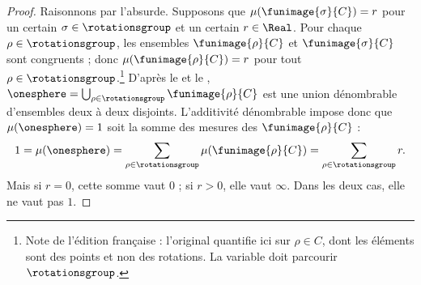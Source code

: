\documentclass[../../../include/open-logic-section]{subfiles}
\begin{document}
\begin{proof}
Raisonnons par l'absurde.
Supposons que
$\mu(\funimage{\sigma}{C})=r$
pour un certain
$\sigma\in\rotationsgroup$
et un certain $r\in\Real$.
Pour chaque
$\rho\in\rotationsgroup$,
les ensembles
$\funimage{\rho}{C}$ et
$\funimage{\sigma}{C}$
sont congruents ; donc
$\mu(\funimage{\rho}{C})=r$
pour tout
$\rho\in\rotationsgroup$.\footnote{
Note de l'édition française :
l'original quantifie ici sur
$\rho\in C$, dont les éléments
sont des points et non des
rotations. La variable doit
parcourir $\rotationsgroup$.}
D'après le 
et le ,
$\onesphere=
\bigcup_{\rho\in\rotationsgroup}
\funimage{\rho}{C}$
est une union dénombrable
d'ensembles deux à deux
disjoints. L'additivité
dénombrable impose donc
que $\mu(\onesphere)=1$
soit la somme des mesures
des $\funimage{\rho}{C}$ :
\[
	1=\mu(\onesphere)
	=\sum_{\rho\in\rotationsgroup}
	\mu(\funimage{\rho}{C})
	=\sum_{\rho\in\rotationsgroup}r.
\]
Mais si $r=0$, cette somme
vaut $0$ ; si $r>0$, elle
vaut $\infty$. Dans les
deux cas, elle ne vaut
pas $1$.
\end{proof}
\end{document}
